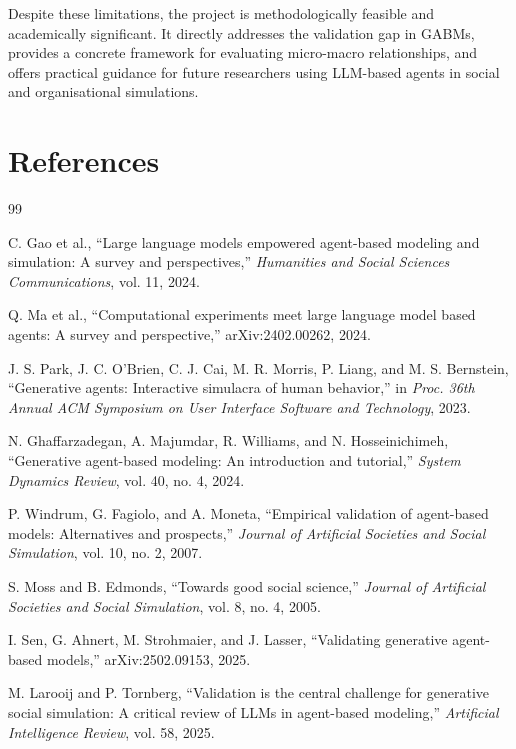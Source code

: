 \documentclass[11pt]{article}
\begin{document}
Despite these limitations, the project is methodologically feasible and academically significant. It directly addresses the validation gap in GABMs, provides a concrete framework for evaluating micro-macro relationships, and offers practical guidance for future researchers using LLM-based agents in social and organisational simulations.

\section*{References}
\begin{thebibliography}{99}

C. Gao et al., ``Large language models empowered agent-based modeling and simulation: A survey and perspectives,'' \emph{Humanities and Social Sciences Communications}, vol. 11, 2024.

Q. Ma et al., ``Computational experiments meet large language model based agents: A survey and perspective,'' arXiv:2402.00262, 2024.

J. S. Park, J. C. O'Brien, C. J. Cai, M. R. Morris, P. Liang, and M. S. Bernstein, ``Generative agents: Interactive simulacra of human behavior,'' in \emph{Proc. 36th Annual ACM Symposium on User Interface Software and Technology}, 2023.

N. Ghaffarzadegan, A. Majumdar, R. Williams, and N. Hosseinichimeh, ``Generative agent-based modeling: An introduction and tutorial,'' \emph{System Dynamics Review}, vol. 40, no. 4, 2024.

P. Windrum, G. Fagiolo, and A. Moneta, ``Empirical validation of agent-based models: Alternatives and prospects,'' \emph{Journal of Artificial Societies and Social Simulation}, vol. 10, no. 2, 2007.

S. Moss and B. Edmonds, ``Towards good social science,'' \emph{Journal of Artificial Societies and Social Simulation}, vol. 8, no. 4, 2005.

I. Sen, G. Ahnert, M. Strohmaier, and J. Lasser, ``Validating generative agent-based models,'' arXiv:2502.09153, 2025.

M. Larooij and P. Tornberg, ``Validation is the central challenge for generative social simulation: A critical review of LLMs in agent-based modeling,'' \emph{Artificial Intelligence Review}, vol. 58, 2025.


\end{thebibliography}
\end{document}
